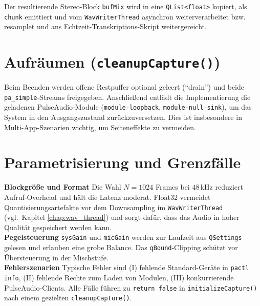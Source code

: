 Der resultierende Stereo-Block \texttt{bufMix} wird in eine \texttt{QList<float>} kopiert, als \texttt{chunk} emittiert und vom \texttt{WavWriterThread} asynchron weiterverarbeitet bzw. resamplet und ans Echtzeit-Transkriptions-Skript weitergereicht.


\section{Aufräumen (\texttt{cleanupCapture()})}
\label{sec:linux_cleanup}

Beim Beenden werden offene Restpuffer optional geleert (\enquote{drain}) und beide \texttt{pa\_simple}-Streams freigegeben. Anschließend entlädt die Implementierung die geladenen PulseAudio-Module (\texttt{module-loopback}, \texttt{module-null-sink}), um das System in den Ausgangszustand zurückzuversetzen. Dies ist insbesondere in Multi-App-Szenarien wichtig, um Seiteneffekte zu vermeiden.


\section{Parametrisierung und Grenzfälle}
\label{sec:linux_params}

\textbf{Blockgröße und Format} Die Wahl $N=1024$ Frames bei $48$\,kHz reduziert Aufruf-Overhead und hält die Latenz moderat. Float32 vermeidet Quantisierungsartefakte vor dem Downsampling im \texttt{WavWriterThread} (vgl.\ Kapitel \ref{chap:wav_thread}) und sorgt dafür, dass das Audio in hoher Qualität gespeichert werden kann.\\

\textbf{Pegelsteuerung} \texttt{sysGain} und \texttt{micGain} werden zur Laufzeit aus \texttt{QSettings} gelesen und erlauben eine grobe Balance. Das \texttt{qBound}-Clipping schützt vor Übersteuerung in der Mischstufe.\\

\textbf{Fehlerszenarien} Typische Fehler sind (I) fehlende Standard-Geräte in \texttt{pactl info},
(II) fehlende Rechte zum Laden von Modulen,
(III) konkurrierende PulseAudio-Clients.
Alle Fälle führen zu \texttt{return false} in \texttt{initializeCapture()} nach einem gezielten \texttt{cleanupCapture()}.
